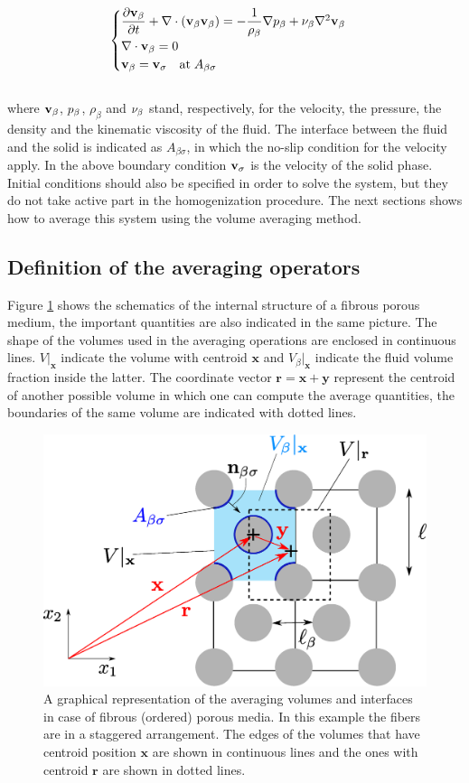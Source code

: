 \begin{eqnarray}
	\begin{cases}
		\dfrac{\partial \textbf{v}_{\beta}}{\partial t} +  \nabla \cdot (\textbf{v}_{\beta} \textbf{v}_{\beta})  = -\dfrac{1}{\rho_{\beta}} \nabla p_{\beta} + \nu_{\beta} \nabla^2  \textbf{v}_{\beta}  \\
		\nabla \cdot \textbf{v}_{\beta} = 0 \\
		\textbf{v}_{\beta} = \textbf{v}_{\sigma} \quad \text{at} \; A_{\beta\sigma}
	\end{cases}
\label{eq:NS}
\end{eqnarray}\\

\noindent where $\textbf{v}_{\beta}$, $p_{\beta}$, $\rho_{\beta}$ and $\nu_{\beta}$ stand, respectively, for  the velocity, the pressure, the density and the kinematic viscosity of the fluid.
The interface between the fluid and the solid is indicated as $A_{\beta\sigma}$, in which the no-slip condition for the velocity apply.
In the above boundary condition $\textbf{v}_{\sigma}$ is the velocity of the solid phase.
Initial conditions should also be specified in order to solve the system, but they do not take active part in the homogenization procedure.
The next sections shows how to average this system using the volume averaging method.

\subsection{Definition of the averaging operators}
Figure \ref{fig:rev} shows the schematics of the internal structure of a fibrous porous medium, the important quantities are also indicated in the same picture.
The shape of the volumes used in the averaging operations are enclosed in continuous lines. $V|_{\mathbf{x}}$ indicate the volume with centroid $\mathbf{x}$ and $V_{\beta}|_{\mathbf{x}}$ indicate the fluid volume fraction inside the latter.
The coordinate vector $\mathbf{r} = \mathbf{x} +\mathbf{y}$ represent the centroid of another possible volume in which one can compute the average quantities, the boundaries of the same volume are indicated with dotted lines.

\begin{figure}[h!]
	\centering
	\includegraphics[width=0.7\linewidth]{chapter_2/figure/REV}
	\caption{A graphical representation of the averaging volumes and interfaces in case of fibrous (ordered) porous media. In this example the fibers are in a staggered arrangement. The edges of the volumes that have centroid position $\mathbf{x}$ are shown in continuous lines and the ones with centroid $\mathbf{r}$ are shown in dotted lines.}
	\label{fig:rev}
\end{figure}


